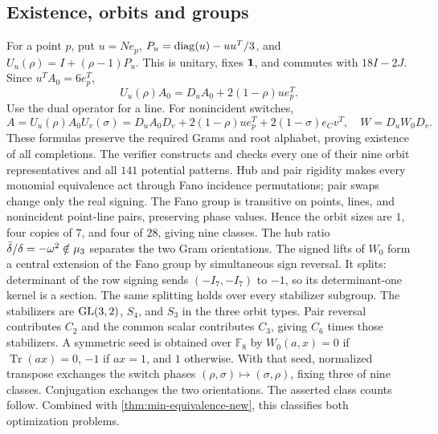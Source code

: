 \subsection{Existence, orbits and groups}
For a point $p$, put $u=Ne_p$, $P_u=\operatorname{diag}(u)-uu^T/3$, and $U_u(\rho)=I+(\rho-1)P_u$. This is unitary, fixes $\mathbf1$, and commutes with $18I-2J$. Since $u^TA_0=6e_p^T$,
\[U_u(\rho)A_0=D_uA_0+2(1-\rho)ue_p^T.\]
Use the dual operator for a line. For nonincident switches,
\[A=U_u(\rho)A_0U_v(\sigma)=D_uA_0D_v+2(1-\rho)ue_p^T+2(1-\sigma)e_Cv^T,
\quad W=D_uW_0D_v.\]
These formulas preserve the required Grams and root alphabet, proving existence of all completions. The verifier constructs and checks every one of their nine orbit representatives and all $141$ potential patterns.
Hub and pair rigidity makes every monomial equivalence act through Fano incidence permutations; pair swaps change only the real signing. The Fano group is transitive on points, lines, and nonincident point-line pairs, preserving phase values. Hence the orbit sizes are $1$, four copies of $7$, and four of $28$, giving nine classes. The hub ratio $\bar\delta/\delta=-\omega^2\notin\mu_3$ separates the two Gram orientations.
The signed lifts of $W_0$ form a central extension of the Fano group by simultaneous sign reversal. It splits: determinant of the row signing sends $(-I_7,-I_7)$ to $-1$, so its determinant-one kernel is a section. The same splitting holds over every stabilizer subgroup. The stabilizers are $\operatorname{GL}(3,2)$, $S_4$, and $S_3$ in the three orbit types. Pair reversal contributes $C_2$ and the common scalar contributes $C_3$, giving $C_6$ times those stabilizers.
A symmetric seed is obtained over $\mathbb F_8$ by $W_0(a,x)=0$ if $\operatorname{Tr}(ax)=0$, $-1$ if $ax=1$, and $1$ otherwise. With that seed, normalized transpose exchanges the switch phases $(\rho,\sigma)\mapsto(\sigma,\rho)$, fixing three of nine classes. Conjugation exchanges the two orientations. The asserted class counts follow.
Combined with \cref{thm:min-equivalence-new}, this classifies both optimization problems.
